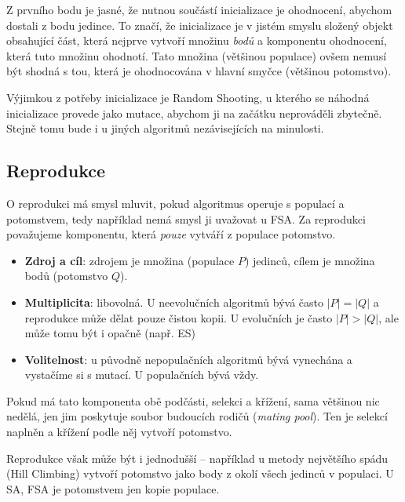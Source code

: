 Z prvního bodu je jasné, že nutnou součástí inicializace je ohodnocení, abychom dostali z bodu jedince. To značí, že inicializace je v jistém smyslu složený objekt obsahující část, která nejprve vytvoří množinu \emph{bodů} a komponentu ohodnocení, která tuto množinu ohodnotí. Tato množina (většinou populace) ovšem nemusí být shodná s tou, která je ohodnocována v hlavní smyčce (většinou potomstvo).

Výjimkou z potřeby inicializace je Random Shooting, u kterého se náhodná inicializace provede jako mutace, abychom ji na začátku neprováděli zbytečně. Stejně tomu bude i u jiných algoritmů nezávisejících na minulosti.

\subsection{Reprodukce}

O reprodukci má smysl mluvit, pokud algoritmus operuje s populací a potomstvem, tedy například nemá smysl ji uvažovat u FSA. Za reprodukci považujeme komponentu, která \emph{pouze} vytváří z populace potomstvo.
\begin{itemize}
  \item \textbf{Zdroj a cíl}: zdrojem je množina (populace $P$) jedinců, cílem je množina bodů (potomstvo $Q$).
  \item \textbf{Multiplicita}: libovolná. U neevolučních algoritmů bývá často $|P|=|Q|$ a reprodukce může dělat pouze čistou kopii. U evolučních je často $|P|>|Q|$, ale může tomu být i opačně (např. ES)
  \item \textbf{Volitelnost}: u původně nepopulačních algoritmů bývá vynechána a vystačíme si s mutací. U populačních bývá vždy.
\end{itemize}

Pokud má tato komponenta obě podčásti, selekci a křížení, sama většinou nic nedělá, jen jim poskytuje soubor budoucích rodičů (\emph{mating pool}). Ten je selekcí naplněn a křížení podle něj vytvoří potomstvo.

Reprodukce však může být i jednodušší -- například u metody největšího spádu (Hill Climbing) vytvoří potomstvo jako body z okolí všech jedinců v populaci. U SA, FSA je potomstvem jen kopie populace. 

